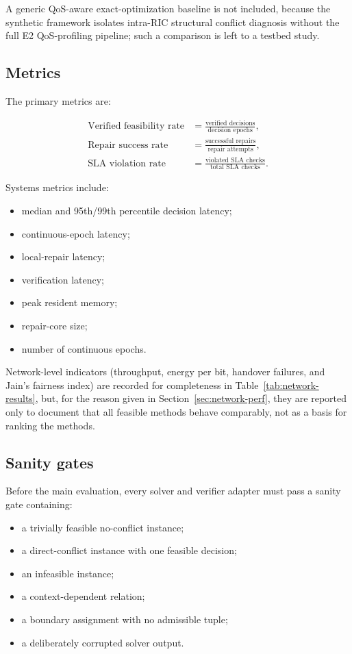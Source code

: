 \documentclass[pdflatex,sn-mathphys-num,iicol,oneside]{sn-jnl}
\begin{document}
A generic QoS-aware exact-optimization baseline is not included,
because the synthetic framework isolates intra-RIC structural conflict
diagnosis without the full E2 QoS-profiling pipeline; such a
comparison is left to a testbed study.

\subsection{Metrics}

The primary metrics are:

\begin{align}
\text{Verified feasibility rate}
&=
\frac{\text{verified decisions}}
{\text{decision epochs}},
\\
\text{Repair success rate}
&=
\frac{\text{successful repairs}}
{\text{repair attempts}},
\\
\text{SLA violation rate}
&=
\frac{\text{violated SLA checks}}
{\text{total SLA checks}}.
\end{align}

Systems metrics include:

\begin{itemize}
    \item median and 95th/99th percentile decision latency;
    \item continuous-epoch latency;
    \item local-repair latency;
    \item verification latency;
    \item peak resident memory;
    \item repair-core size;
    \item number of continuous epochs.
\end{itemize}

Network-level indicators (throughput, energy per bit, handover
failures, and Jain's fairness index) are recorded for completeness in
Table~\ref{tab:network-results}, but, for the reason given in
Section~\ref{sec:network-perf}, they are reported only to document
that all feasible methods behave comparably, not as a basis for
ranking the methods.

\subsection{Sanity gates}

Before the main evaluation, every solver and verifier adapter must
pass a sanity gate containing:

\begin{itemize}
    \item a trivially feasible no-conflict instance;
    \item a direct-conflict instance with one feasible decision;
    \item an infeasible instance;
    \item a context-dependent relation;
    \item a boundary assignment with no admissible tuple;
    \item a deliberately corrupted solver output.
\end{itemize}
\end{document}
